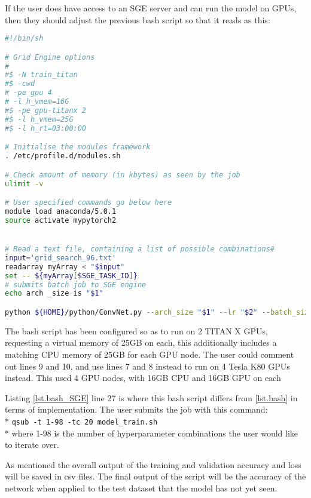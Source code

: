 If the user does have access to an SGE server and can run the model on GPUs, then they should adjust the previous bash script so that it reads as this:
\begin{lstlisting}[language=bash, caption = {Bash script to submit the \texttt{ConvNet.py} script to an SGE server, iterating over a list containing a specific number of values}, label={lst.bash_SGE}]
#!/bin/sh

# Grid Engine options
#
#$ -N train_titan
#$ -cwd
# -pe gpu 4 
# -l h_vmem=16G
#$ -pe gpu-titanx 2
#$ -l h_vmem=25G
#$ -l h_rt=03:00:00

# Initialise the modules framework
. /etc/profile.d/modules.sh

# Check amount of memory (in kbytes) as seen by the job
ulimit -v

# User specified commands go below here
module load anaconda/5.0.1
source activate mypytorch2


# Read a text file, containing a list of possible combinations#
input='grid_search_96.txt'
readarray myArray < "$input"
set -- ${myArray[$SGE_TASK_ID]}
# submits batch job to SGE engine
echo arch _size is "$1"

python ${HOME}/python/ConvNet.py --arch_size "$1" --lr "$2" --batch_size "$3" 

\end{lstlisting}
The bash script has been configured so as to run on 2 TITAN X GPUs, requesting a virtual memory of 25GB on each, this additionally includes a matching CPU memory of 25GB for each GPU node. The user could comment out lines 9 and 10, and use lines 7 and 8 instead to run on 4 Tesla K80 GPUs instead. This used 4 GPU nodes, with 16GB CPU and 16GB GPU on each
\par
Listing \ref{lst.bash_SGE} line 27 is where this bash script differs from \ref{lst.bash} in terms of implementation. The user submits the job with this command: \medskip \\* \texttt{qsub -t 1-98 -tc 20 model\_train.sh}  \medskip \\* where 1-98 is the number of hyperparameter combinations the user would like to iterate over.
\par
As mentioned the overall output of the training and validation accuracy and loss will be saved in csv files. The final output of the script will be the accuracy of the network when applied to the test dataset that the model has not yet seen. 

